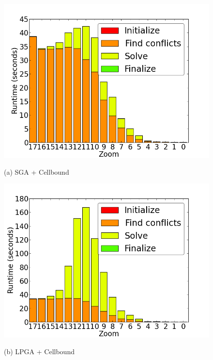 \begin{figure}[tb]
  \begin{minipage}{0.329\linewidth}
    \centerline{\includegraphics[width=1.0\linewidth]{./figs/prelim_pnt_500k_tourism_heuristic_A.png}}
    \centerline{(a) SGA + Cellbound}
  \end{minipage} \hfill
  \begin{minipage}{0.329\linewidth}
    \centerline{\includegraphics[width=1.0\linewidth]{./figs/prelim_pnt_500k_tourism_lp_A.png}}
    \centerline{(b) LPGA + Cellbound}
  \end{minipage} \hfill
  \begin{minipage}{0.329\linewidth}

\end{minipage}
\end{figure}
